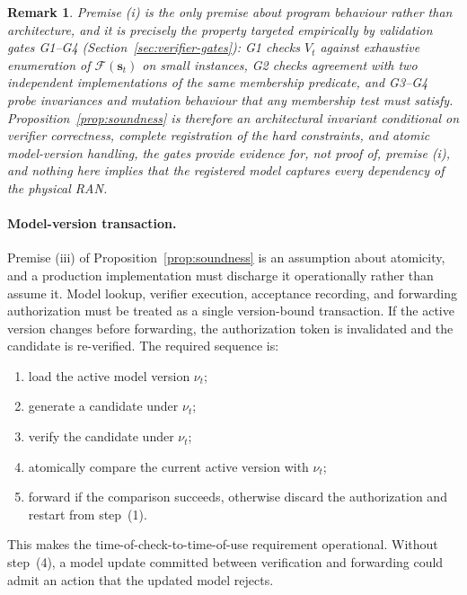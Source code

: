 \documentclass[pdflatex,sn-mathphys-num,iicol,oneside]{sn-jnl}
\newtheorem{remark}{Remark}
\begin{document}
\begin{remark}
\label{rem:soundness-premise}
Premise (i) is the only premise about program behaviour rather than
architecture, and it is precisely the property targeted empirically by
validation gates G1--G4 (Section~\ref{sec:verifier-gates}): G1 checks
$V_t$ against exhaustive enumeration of $\mathcal{F}(\bm{s}_t)$ on
small instances, G2 checks agreement with two independent
implementations of the same membership predicate, and G3--G4 probe
invariances and mutation behaviour that any membership test must
satisfy. Proposition~\ref{prop:soundness} is therefore an
architectural invariant conditional on verifier correctness, complete
registration of the hard constraints, and atomic model-version
handling, the gates provide evidence for, not proof of, premise (i),
and nothing here implies that the registered model captures every
dependency of the physical RAN.
\end{remark}

\paragraph{Model-version transaction.}
Premise (iii) of Proposition~\ref{prop:soundness} is an assumption
about atomicity, and a production implementation must discharge it
operationally rather than assume it. Model lookup, verifier
execution, acceptance recording, and forwarding authorization must be
treated as a single version-bound transaction. If the active version
changes before forwarding, the authorization token is invalidated and
the candidate is re-verified. The required sequence is:

\begin{enumerate}[label=(\arabic*),leftmargin=2.0em]
\item load the active model version $\nu_t$;
\item generate a candidate under $\nu_t$;
\item verify the candidate under $\nu_t$;
\item atomically compare the current active version with $\nu_t$;
\item forward if the comparison succeeds, otherwise discard the
authorization and restart from step~(1).
\end{enumerate}

This makes the time-of-check-to-time-of-use requirement operational.
Without step~(4), a model update committed between verification and
forwarding could admit an action that the updated model rejects.
\end{document}
